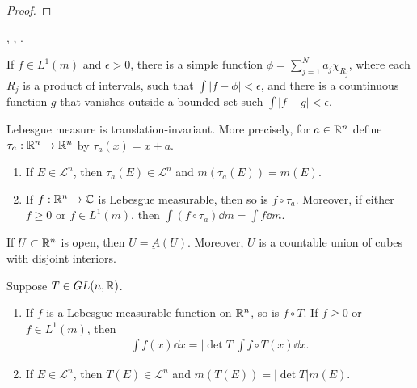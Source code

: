 \begin{proof}
    
\end{proof}

, , .

\begin{theorem}
    If $f \in L^1(m)$ and $\epsilon > 0$, there is a simple function $\phi = \sum_{j=1}^{N} a_j \chi_{R_j}$, where each $R_j$ is a product of intervals, such that $\int |f - \phi| < \epsilon$, and there is a countinuous function $g$ that vanishes outside a bounded set such $\int |f-g| < \epsilon$. 
\end{theorem}

\begin{theorem}
    Lebesgue measure is translation-invariant.
    More precisely, for $a \in \mathbb{R}^n$ define $\tau_a: \mathbb{R}^n \to \mathbb{R}^n$ by $\tau_a(x) = x + a$.
    \begin{enumerate}
        \item If $E \in \mathcal{L}^n$, then $\tau_a (E) \in \mathcal{L}^n$ and $m(\tau_a(E)) = m(E)$.
        \item If $f: \mathbb{R}^n \to \mathbb{C}$ is Lebesgue measurable, then so is $f \circ \tau_a$. Moreover, if either $f \ge 0$ or $f \in L^1(m)$, then $\int (f \circ \tau_a) \dd m = \int f \dd m$.
    \end{enumerate}
\end{theorem}

\begin{lemma}
    If $U \subset \mathbb{R}^n$ is open, then $U = \underbar{A}(U)$.
    Moreover, $U$ is a countable union of cubes with disjoint interiors.
\end{lemma}

\begin{theorem}
    Suppose $T \in GL(n, \mathbb{R})$.
    \begin{enumerate}
        \item If $f$ is a Lebesgue measurable function on $\mathbb{R}^n$, so is $f \circ T$. If $f \ge 0$ or $f \in L^1(m)$, then
        \begin{align}
            \int f(x) \dd x = |\det T| \int f \circ T(x) \dd x.
        \end{align}
        \item If $E \in \mathcal{L}^n$, then $T(E) \in \mathcal{L}^n$ and $m(T(E)) = |\det T| m(E)$.
    \end{enumerate}
\end{theorem}

